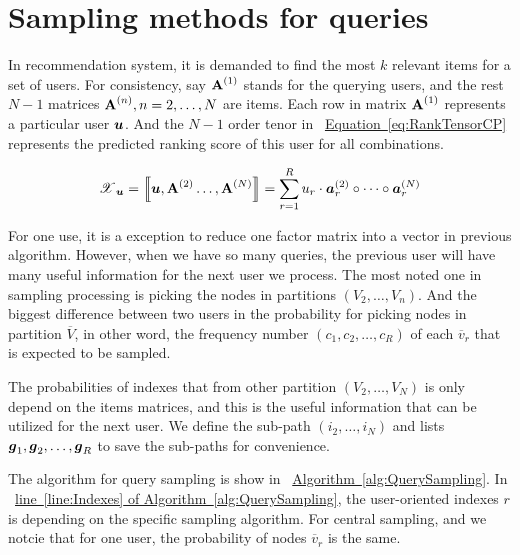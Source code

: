 \documentclass[letterpaper]{article}
\newcommand{\T}[1]{\boldsymbol{\mathscr{\MakeUppercase{#1}}}}
\newcommand{\KT}[1]{\left\llbracket #1 \right\rrbracket}
\newcommand{\V}[1]{{\bm{{\MakeLowercase{#1}}}}}
\newcommand{\VnC}[3]{\V{#1}^{(#2)}_{#3}}
\newcommand{\M}[1]{{\bm{\mathbf{\MakeUppercase{#1}}}}}
\newcommand{\Mn}[2]{\M{#1}^{(#2)}}
\newcommand{\Eqn}[1] {\hyperref[eq:#1]  {Equation~\ref*{eq:#1}}}
\newcommand{\Alg}[1] {\hyperref[alg:#1] {Algorithm~\ref*{alg:#1}}}
\newcommand{\AlgLine}[2]{\hyperref[alg:#1]{line~\ref*{line:#2} of Algorithm~\ref*{alg:#1}}}
\begin{document}
\section{Sampling methods for queries}

In recommendation system, it is demanded to find the most $k$ relevant items for a set of users. For consistency, say $\M{A}^{(1)}$ stands for the querying users, and the rest $N-1$ matrices $\M{A}^{(n)},n=2,\ldots,N$ are items. Each row in matrix $\M{A}^{(1)}$ represents a particular user $\V{u}$. And the $N-1$ order tenor in ~\Eqn{RankTensorCP} represents the predicted ranking score of this user for all combinations.

\begin{equation}\label{eq:RankTensorCP}
\T{X}_{\V{u}}= \KT{ \V{u},\Mn{A}{2}\dots,\Mn{A}{N}} =
\sum_{r=1}^{R} u_r \cdot \VnC{A}{2}{r}\circ \cdots \circ \VnC{A}{N}{r}
\end{equation}

For one use, it is a exception to reduce one factor matrix into a vector in previous algorithm. However, when we have so many queries, the previous user will have many useful information for the next user we process. The most noted one in sampling processing is picking the nodes in partitions $(V_2,\ldots,V_n)$. And the biggest difference between two users in the probability for picking nodes in partition $\overline{V}$, in other word, the frequency number $(c_1,c_2,\ldots,c_R)$ of each $\overline{v}_r$ that is expected to be sampled.

The probabilities of indexes that from other partition $(V_2,\ldots,V_N)$ is only depend on the items matrices, and this is the useful information that can be utilized for the next user. We define the sub-path $(i_2,\ldots,i_N)$ and lists $\V{g}_1,\V{g}_2,\ldots,\V{g}_R$ to save the sub-paths for convenience. 

The algorithm for query sampling is show in ~\Alg{QuerySampling}.
In ~\AlgLine{QuerySampling}{Indexes}, the user-oriented indexes $r$ is depending on the 
specific sampling algorithm. For central sampling, and we notcie that for one user, the probability of nodes $\overline{v}_r$ is the same.
\end{document}
